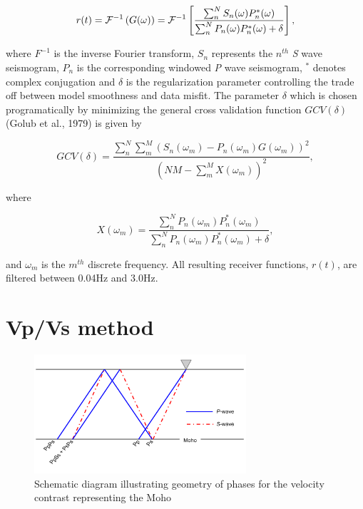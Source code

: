 \documentclass[msc,oneside]{ubcthesis}
\begin{document}
\begin{equation}
  r(t) = {\cal F}^{-1} \left( G(\omega) \right) = {\cal F}^{-1}
 \left[ \frac {\sum_n^N S_n(\omega)P_n^*(\omega)} {\sum_n^N P_n(\omega)P_n^*(\omega) + \delta} \right ],
\end{equation}

\noindent where $F^{-1}$ is the inverse Fourier transform, $S_n$ represents the $n^{th}$ {\it S} wave seismogram, $P_n$ is the corresponding windowed {\it P} wave seismogram, $^*$ denotes complex conjugation and $\delta$ is the regularization parameter controlling the trade off between model smoothness and data misfit. The parameter $\delta$ which is chosen programatically by minimizing the general cross validation function $GCV(\delta)$ (Golub et al., 1979) is given by

\begin{equation}
  GCV(\delta) = \frac {\sum_n^N\sum_m^M \left( S_n(\omega_m) - P_n(\omega_m)G(\omega_m) \right)^2 }
                      { \left( NM - \sum_m^M X(\omega_m) \right)^2 },
\end{equation}

\noindent where

\begin{equation}
  X(\omega_m) = \frac {\sum_n^N P_n(\omega_m)P_n^*(\omega_m)} {\sum_n^N P_n(\omega_m)P_n^*(\omega_m) + \delta},
\end{equation}

\noindent and $\omega_m$ is the $m^{th}$ discrete frequency. All resulting receiver functions, $r(t)$, are filtered between 0.04Hz and 3.0Hz.



\section{Vp/Vs method} \label{section:VpVsMethod}

\begin{figure}
  \centering
    \includegraphics[width=0.7\textwidth]{reflectedPhases.pdf}
  \caption[Teleseismic reflection phase diagram]{Schematic diagram illustrating geometry of phases for the velocity contrast representing the Moho}
  \label{fig:reflectedPhases}
\end{figure}
\end{document}
